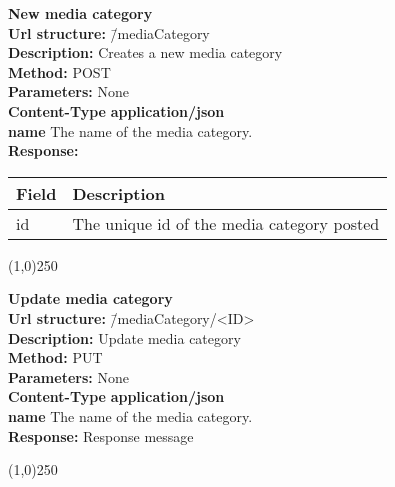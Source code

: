 \documentclass[11pt]{article}
\begin{document}
\begin{tabbing}
\textbf{New media category} \\
\textcolor{black!60}{\textbf{Url structure:}} \hspace{0.2in} \= /mediaCategory \\
\textcolor{black!60}{\textbf{Description:}}  \> Creates a new media category \\
\textcolor{black!60}{\textbf{Method:}} \> POST \\
\textcolor{black!60}{\textbf{Parameters:}} \> None \\
\textcolor{black!60}{\textbf{Content-Type}} \> \textbf{application/json} \\
\> \textbf{name} The name of the media category. \\
\textcolor{black!60}{\textbf{Response:}} \\ \>
\begin{tabular}{|l|l|}
\hline
 Field  &  Description                                 \\
\hline
 id     &  The unique id of the media category posted  \\
\hline
\end{tabular}
\end{tabbing}

\begin{center}\line(1,0){250}\end{center}

\begin{tabbing}
\textbf{Update media category} \\
\textcolor{black!60}{\textbf{Url structure:}} \hspace{0.2in} \= /mediaCategory/<ID> \\
\textcolor{black!60}{\textbf{Description:}}  \> Update media category \\
\textcolor{black!60}{\textbf{Method:}} \> PUT \\
\textcolor{black!60}{\textbf{Parameters:}} \> None \\
\textcolor{black!60}{\textbf{Content-Type}} \> \textbf{application/json} \\
\> \textbf{name} The name of the media category. \\
\textcolor{black!60}{\textbf{Response:}} \> Response message
\end{tabbing}

\begin{center}\line(1,0){250}\end{center}
\end{document}
